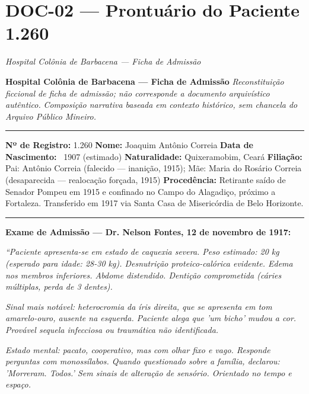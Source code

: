 \section*{\textbf{DOC-02} --- Prontuário do Paciente 1.260}

\noindent \textit{Hospital Colônia de Barbacena --- Ficha de Admissão}

\noindent \textbf{Hospital Colônia de Barbacena --- Ficha de Admissão}
\textit{Reconstituição ficcional de ficha de admissão; não corresponde a documento arquivístico autêntico.}
\textit{Composição narrativa baseada em contexto histórico, sem chancela do Arquivo Público Mineiro.}

\vspace{0.5em}\noindent\rule{\textwidth}{0.5pt}\vspace{0.5em}

\noindent \textbf{Nº de Registro:} 1.260  
\textbf{Nome:} Joaquim Antônio Correia  
\textbf{Data de Nascimento:} ~1907 (estimado)  
\textbf{Naturalidade:} Quixeramobim, Ceará  
\textbf{Filiação:} Pai: Antônio Correia (falecido --- inanição, 1915); Mãe: Maria do Rosário Correia (desaparecida --- realocação forçada, 1915)  
\textbf{Procedência:} Retirante saído de Senador Pompeu em 1915 e confinado no Campo do Alagadiço, próximo a Fortaleza. Transferido em 1917 via Santa Casa de Misericórdia de Belo Horizonte.

\vspace{0.5em}\noindent\rule{\textwidth}{0.5pt}\vspace{0.5em}

\noindent \textbf{Exame de Admissão --- Dr. Nelson Fontes, 12 de novembro de 1917:}

\noindent \textit{\textquotedblleft{}Paciente apresenta-se em estado de caquexia severa. Peso estimado: 20 kg (esperado para idade: 28-30 kg). Desnutrição proteico-calórica evidente. Edema nos membros inferiores. Abdome distendido. Dentição comprometida (cáries múltiplas, perda de 3 dentes).}

\noindent \textit{Sinal mais notável: heterocromia da íris direita, que se apresenta em tom amarelo-ouro, ausente na esquerda. Paciente alega que 'um bicho' mudou a cor. Provável sequela infecciosa ou traumática não identificada.}

\noindent \textit{Estado mental: pacato, cooperativo, mas com olhar fixo e vago. Responde perguntas com monossílabos. Quando questionado sobre a família, declarou: 'Morreram. Todos.' Sem sinais de alteração de sensório. Orientado no tempo e espaço.}

